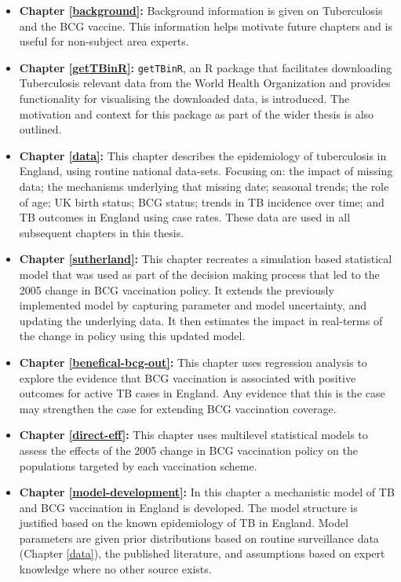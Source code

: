\documentclass[11pt,twoside]{bristolthesis}
\begin{document}
  \begin{itemize}
  \item
    \textbf{Chapter \ref{background}:} Background information is given on Tuberculosis and the BCG vaccine. This information helps motivate future chapters and is useful for non-subject area experts.
  \item
    \textbf{Chapter \ref{getTBinR}:} \texttt{getTBinR}, an R package that facilitates downloading Tuberculosis relevant data from the World Health Organization and provides functionality for visualising the downloaded data, is introduced. The motivation and context for this package as part of the wider thesis is also outlined.
  \item
    \textbf{Chapter \ref{data}:} This chapter describes the epidemiology of tuberculosis in England, using routine national data-sets. Focusing on: the impact of missing data; the mechanisms underlying that missing date; seasonal trends; the role of age; UK birth status; BCG status; trends in TB incidence over time; and TB outcomes in England using case rates. These data are used in all subsequent chapters in this thesis.
  \item
    \textbf{Chapter \ref{sutherland}:} This chapter recreates a simulation based statistical model that was used as part of the decision making process that led to the 2005 change in BCG vaccination policy. It extends the previously implemented model by capturing parameter and model uncertainty, and updating the underlying data. It then estimates the impact in real-terms of the change in policy using this updated model.
  \item
    \textbf{Chapter \ref{benefical-bcg-out}:} This chapter uses regression analysis to explore the evidence that BCG vaccination is associated with positive outcomes for active TB cases in England. Any evidence that this is the case may strengthen the case for extending BCG vaccination coverage.
  \item
    \textbf{Chapter \ref{direct-eff}:} This chapter uses multilevel statistical models to assess the effects of the 2005 change in BCG vaccination policy on the populations targeted by each vaccination scheme.
  \item
    \textbf{Chapter \ref{model-development}:} In this chapter a mechanistic model of TB and BCG vaccination in England is developed. The model structure is justified based on the known epidemiology of TB in England. Model parameters are given prior distributions based on routine surveillance data (Chapter \ref{data}), the published literature, and assumptions based on expert knowledge where no other source exists.

\end{itemize}
\end{document}

